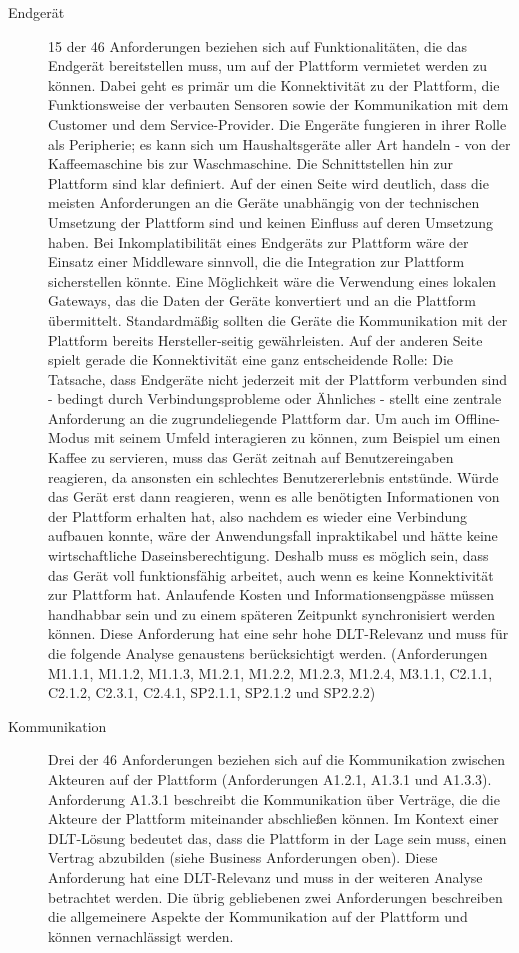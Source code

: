 \begin{description}
  \item[Endgerät] 15 der 46 Anforderungen beziehen sich auf Funktionalitäten, die das Endgerät bereitstellen muss, um auf der Plattform vermietet werden zu können. Dabei geht es primär um die Konnektivität zu der Plattform, die Funktionsweise der verbauten Sensoren sowie der Kommunikation mit dem Customer und dem Service-Provider. Die Engeräte fungieren in ihrer Rolle als Peripherie; es kann sich um Haushaltsgeräte aller Art handeln - von der Kaffeemaschine bis zur Waschmaschine. Die Schnittstellen hin zur Plattform sind klar definiert. Auf der einen Seite wird deutlich, dass die meisten Anforderungen an die Geräte unabhängig von der technischen Umsetzung der Plattform sind und keinen Einfluss auf deren Umsetzung haben. Bei Inkomplatibilität eines Endgeräts zur Plattform wäre der Einsatz einer Middleware sinnvoll, die die Integration zur Plattform sicherstellen könnte. Eine Möglichkeit wäre die Verwendung eines lokalen Gateways, das die Daten der Geräte konvertiert und an die Plattform übermittelt. Standardmäßig sollten die Geräte die Kommunikation mit der Plattform bereits Hersteller-seitig gewährleisten. Auf der anderen Seite spielt gerade die Konnektivität eine ganz entscheidende Rolle: Die Tatsache, dass Endgeräte nicht jederzeit mit der Plattform verbunden sind - bedingt durch Verbindungsprobleme oder Ähnliches - stellt eine zentrale Anforderung an die zugrundeliegende Plattform dar. Um auch im Offline-Modus mit seinem Umfeld interagieren zu können, zum Beispiel um einen Kaffee zu servieren, muss das Gerät zeitnah auf Benutzereingaben reagieren, da ansonsten ein schlechtes Benutzererlebnis entstünde. Würde das Gerät erst dann reagieren, wenn es alle benötigten Informationen von der Plattform erhalten hat, also nachdem es wieder eine Verbindung aufbauen konnte, wäre der Anwendungsfall inpraktikabel und hätte keine wirtschaftliche Daseinsberechtigung. Deshalb muss es möglich sein, dass das Gerät voll funktionsfähig arbeitet, auch wenn es keine Konnektivität zur Plattform hat. Anlaufende Kosten und Informationsengpässe müssen handhabbar sein und zu einem späteren Zeitpunkt synchronisiert werden können. Diese Anforderung hat eine sehr hohe \ac{DLT}-Relevanz und muss für die folgende Analyse genaustens berücksichtigt werden. (Anforderungen M1.1.1, M1.1.2, M1.1.3, M1.2.1, M1.2.2, M1.2.3, M1.2.4, M3.1.1, C2.1.1, C2.1.2, C2.3.1, C2.4.1, SP2.1.1, SP2.1.2 und SP2.2.2)
  \item[Kommunikation] Drei der 46 Anforderungen beziehen sich auf die Kommunikation zwischen Akteuren auf der Plattform (Anforderungen A1.2.1, A1.3.1 und A1.3.3). Anforderung A1.3.1 beschreibt die Kommunikation über Verträge, die die Akteure der Plattform miteinander abschließen können. Im Kontext einer \ac{DLT}-Lösung bedeutet das, dass die Plattform in der Lage sein muss, einen Vertrag abzubilden (siehe Business Anforderungen oben). Diese Anforderung hat eine \ac{DLT}-Relevanz und muss in der weiteren Analyse betrachtet werden. Die übrig gebliebenen zwei Anforderungen beschreiben die allgemeinere Aspekte der Kommunikation auf der Plattform und können vernachlässigt werden.

\end{description}
